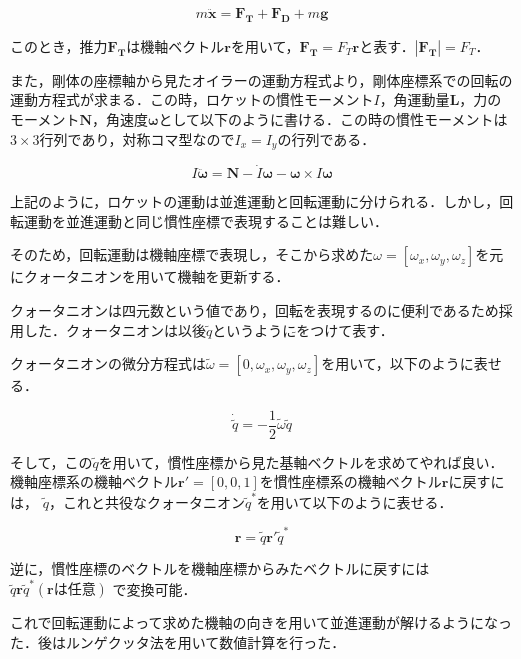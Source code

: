 \documentclass[a4paper]{jsarticle}
\begin{document}
\begin{equation}
m \bm{\ddot{x}} = \bm{F_T} + \bm{F_D} + m\bm{g}
\end{equation}

このとき，推力$\bm{F_T}$は機軸ベクトル$\bm{r}$を用いて，$\bm{F_T} = F_T \bm{r}$と表す．$|\bm{F_T}| = F_T$．


また，剛体の座標軸から見たオイラーの運動方程式より，剛体座標系での回転の運動方程式が求まる．この時，ロケットの慣性モーメント$I$，角運動量$\bm{L}$，力のモーメント$\bm{N}$，角速度$\bm{\omega}$として以下のように書ける．この時の慣性モーメントは$3\times3$行列であり，対称コマ型なので$I_x = I_y$の行列である．

\begin{equation}
I \bm{\ddot{\omega}} = \bm{N} - \dot{I}\bm{\omega} - \bm{\omega} \times I \bm{\omega}
\end{equation}

上記のように，ロケットの運動は並進運動と回転運動に分けられる．しかし，回転運動を並進運動と同じ慣性座標で表現することは難しい．

そのため，回転運動は機軸座標で表現し，そこから求めた$\omega = [\omega_x, \omega_y, \omega_z]$を元にクォータニオンを用いて機軸を更新する．

クォータニオンは四元数という値であり，回転を表現するのに便利であるため採用した．クォータニオンは以後$\tilde{q}$というように$\tilde{}$をつけて表す．

クォータニオンの微分方程式は$\tilde{\omega} = [0, \omega_x, \omega_y, \omega_z]$を用いて，以下のように表せる．

\begin{equation}
\dot{\tilde{q}} = -\frac{1}{2}\tilde{\omega}\tilde{q}
\end{equation}

そして，この$\tilde{q}$を用いて，慣性座標から見た基軸ベクトルを求めてやれば良い．
機軸座標系の機軸ベクトル$\bm{r'} = [0,0,1]$を慣性座標系の機軸ベクトル$\bm{r}$に戻すには，
$\tilde{q}$，これと共役なクォータニオン$\tilde{q}^*$を用いて以下のように表せる．

\begin{equation}
\bm{r} = \tilde{q} \bm{r'} \tilde{q}^*
\end{equation}

逆に，慣性座標のベクトルを機軸座標からみたベクトルに戻すには
$\tilde{q} \bm{r}\tilde{q}^*(\bm{r} は任意)$
で変換可能．

これで回転運動によって求めた機軸の向きを用いて並進運動が解けるようになった．後はルンゲクッタ法を用いて数値計算を行った．
\end{document}
